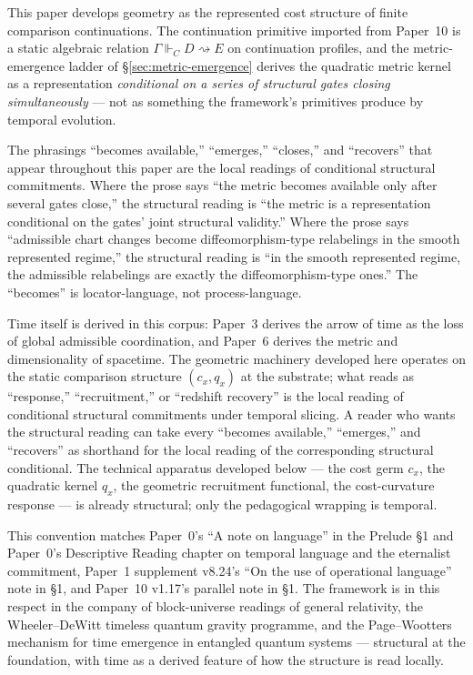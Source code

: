 \documentclass[11pt]{article}
\theoremstyle{remark}
\newcommand{\G}{\Gamma}
\newcommand{\entails}{\Vdash}
\newcommand{\goes}{\rightsquigarrow}
\begin{document}
This paper develops geometry as the represented cost structure of finite comparison continuations.  The continuation primitive imported from Paper~10 is a static algebraic relation $\G\entails_C D\goes E$ on continuation profiles, and the metric-emergence ladder of \S\ref{sec:metric-emergence} derives the quadratic metric kernel as a representation \emph{conditional on a series of structural gates closing simultaneously} --- not as something the framework's primitives produce by temporal evolution.

The phrasings ``becomes available,'' ``emerges,'' ``closes,'' and ``recovers'' that appear throughout this paper are the local readings of conditional structural commitments.  Where the prose says ``the metric becomes available only after several gates close,'' the structural reading is ``the metric is a representation conditional on the gates' joint structural validity.''  Where the prose says ``admissible chart changes become diffeomorphism-type relabelings in the smooth represented regime,'' the structural reading is ``in the smooth represented regime, the admissible relabelings are exactly the diffeomorphism-type ones.''  The ``becomes'' is locator-language, not process-language.

Time itself is derived in this corpus: Paper~3 derives the arrow of time as the loss of global admissible coordination, and Paper~6 derives the metric and dimensionality of spacetime.  The geometric machinery developed here operates on the static comparison structure $(c_x, q_x)$ at the substrate; what reads as ``response,'' ``recruitment,'' or ``redshift recovery'' is the local reading of conditional structural commitments under temporal slicing.  A reader who wants the structural reading can take every ``becomes available,'' ``emerges,'' and ``recovers'' as shorthand for the local reading of the corresponding structural conditional.  The technical apparatus developed below --- the cost germ $c_x$, the quadratic kernel $q_x$, the geometric recruitment functional, the cost-curvature response --- is already structural; only the pedagogical wrapping is temporal.

This convention matches Paper~0's ``A note on language'' in the Prelude \S1 and Paper~0's Descriptive Reading chapter on temporal language and the eternalist commitment, Paper~1 supplement v8.24's ``On the use of operational language'' note in \S1, and Paper~10 v1.17's parallel note in \S1.  The framework is in this respect in the company of block-universe readings of general relativity, the Wheeler--DeWitt timeless quantum gravity programme, and the Page--Wootters mechanism for time emergence in entangled quantum systems --- structural at the foundation, with time as a derived feature of how the structure is read locally.
\end{document}
